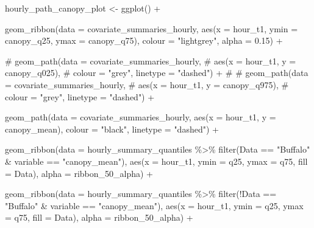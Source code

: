 \documentclass[
  letterpaper,
  DIV=11,
  numbers=noendperiod]{scrartcl}
\newenvironment{Shaded}{\begin{snugshade}}{\end{snugshade}}
\newcommand{\AttributeTok}[1]{\textcolor[rgb]{0.40,0.45,0.13}{#1}}
\newcommand{\CommentTok}[1]{\textcolor[rgb]{0.37,0.37,0.37}{#1}}
\newcommand{\FloatTok}[1]{\textcolor[rgb]{0.68,0.00,0.00}{#1}}
\newcommand{\FunctionTok}[1]{\textcolor[rgb]{0.28,0.35,0.67}{#1}}
\newcommand{\NormalTok}[1]{\textcolor[rgb]{0.00,0.23,0.31}{#1}}
\newcommand{\OtherTok}[1]{\textcolor[rgb]{0.00,0.23,0.31}{#1}}
\newcommand{\SpecialCharTok}[1]{\textcolor[rgb]{0.37,0.37,0.37}{#1}}
\newcommand{\StringTok}[1]{\textcolor[rgb]{0.13,0.47,0.30}{#1}}
\begin{document}
\begin{Shaded}
\begin{Highlighting}[]
\NormalTok{hourly\_path\_canopy\_plot }\OtherTok{\textless{}{-}} \FunctionTok{ggplot}\NormalTok{() }\SpecialCharTok{+}
  
  \FunctionTok{geom\_ribbon}\NormalTok{(}\AttributeTok{data =}\NormalTok{ covariate\_summaries\_hourly,}
              \FunctionTok{aes}\NormalTok{(}\AttributeTok{x =}\NormalTok{ hour\_t1, }\AttributeTok{ymin =}\NormalTok{ canopy\_q25, }\AttributeTok{ymax =}\NormalTok{ canopy\_q75),}
              \AttributeTok{colour =} \StringTok{"lightgrey"}\NormalTok{, }\AttributeTok{alpha =} \FloatTok{0.15}\NormalTok{) }\SpecialCharTok{+}
  
  \CommentTok{\# geom\_path(data = covariate\_summaries\_hourly,}
  \CommentTok{\#           aes(x = hour\_t1, y = canopy\_q025),}
  \CommentTok{\#           colour = "grey", linetype = "dashed") +}
  \CommentTok{\# }
  \CommentTok{\# geom\_path(data = covariate\_summaries\_hourly,}
  \CommentTok{\#           aes(x = hour\_t1, y = canopy\_q975),}
  \CommentTok{\#           colour = "grey", linetype = "dashed") +}

  \FunctionTok{geom\_path}\NormalTok{(}\AttributeTok{data =}\NormalTok{ covariate\_summaries\_hourly,}
            \FunctionTok{aes}\NormalTok{(}\AttributeTok{x =}\NormalTok{ hour\_t1, }\AttributeTok{y =}\NormalTok{ canopy\_mean),}
            \AttributeTok{colour =} \StringTok{"black"}\NormalTok{, }\AttributeTok{linetype =} \StringTok{"dashed"}\NormalTok{) }\SpecialCharTok{+}

  \FunctionTok{geom\_ribbon}\NormalTok{(}\AttributeTok{data =}\NormalTok{ hourly\_summary\_quantiles }\SpecialCharTok{\%\textgreater{}\%} 
                \FunctionTok{filter}\NormalTok{(Data }\SpecialCharTok{==} \StringTok{"Buffalo"} \SpecialCharTok{\&}\NormalTok{ variable }\SpecialCharTok{==} \StringTok{"canopy\_mean"}\NormalTok{),}
              \FunctionTok{aes}\NormalTok{(}\AttributeTok{x =}\NormalTok{ hour\_t1, }\AttributeTok{ymin =}\NormalTok{ q25, }\AttributeTok{ymax =}\NormalTok{ q75, }\AttributeTok{fill =}\NormalTok{ Data),}
              \AttributeTok{alpha =}\NormalTok{ ribbon\_50\_alpha) }\SpecialCharTok{+}

  \FunctionTok{geom\_ribbon}\NormalTok{(}\AttributeTok{data =}\NormalTok{ hourly\_summary\_quantiles }\SpecialCharTok{\%\textgreater{}\%} 
                \FunctionTok{filter}\NormalTok{(}\SpecialCharTok{!}\NormalTok{Data }\SpecialCharTok{==} \StringTok{"Buffalo"} \SpecialCharTok{\&}\NormalTok{ variable }\SpecialCharTok{==} \StringTok{"canopy\_mean"}\NormalTok{),}
              \FunctionTok{aes}\NormalTok{(}\AttributeTok{x =}\NormalTok{ hour\_t1, }\AttributeTok{ymin =}\NormalTok{ q25, }\AttributeTok{ymax =}\NormalTok{ q75, }\AttributeTok{fill =}\NormalTok{ Data),}
              \AttributeTok{alpha =}\NormalTok{ ribbon\_50\_alpha) }\SpecialCharTok{+}
  

\end{Highlighting}
\end{Shaded}
\end{document}
